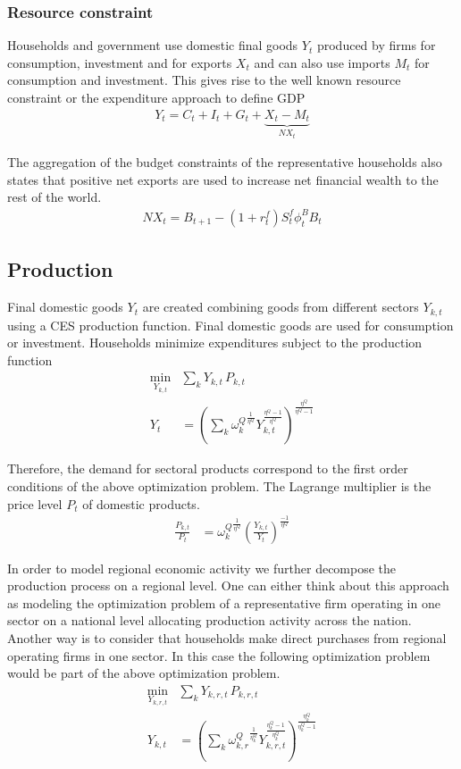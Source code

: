 \documentclass[10pt,a4paper]{article}
\begin{document}
\subsubsection{Resource constraint}

Households and government use domestic final goods $Y_t$ produced by firms for consumption, investment and for exports $X_{t}$ and can also use imports $M_t$ for consumption and investment. This gives rise to the well known resource constraint or the expenditure approach to define GDP 
\begin{align}
Y_{t} = C_{t} + I_{t} + G_{t} + \underbrace{X_{t} - M_{t}}_{NX_{t}}
\end{align}

The aggregation of the budget constraints of the representative households also states that positive net exports are used to increase net financial wealth to the rest of the world.
\begin{align}
NX_t = B_{t+1} - (1 + r^{f}_{t}) S^{f}_{t} \phi^B_{t} B_{t}
\end{align}

\subsection{Production}

Final domestic goods $Y_{t}$ are created combining goods from different sectors $Y_{k,t}$ using a CES production function. Final domestic goods are used for consumption or investment. Households minimize expenditures subject to the production function
\begin{align}
\underset{Y_{k,t}}{\mathrm{min}} & \sum_{k} Y_{k,t} \, P_{k,t} \\ 
Y_{t} &= \left(\sum_{k} {\omega^{Q}_{k}}^{\frac{1}{\eta^Q}} Y_{k,t}^{\frac{\eta^Q-1}{\eta^Q}} \right)^{\frac{\eta^Q}{\eta^Q-1}}
\end{align}

Therefore, the demand for sectoral products correspond to the first order conditions of the above optimization problem. The Lagrange multiplier is the price level $P_{t}$ of domestic products. 
\begin{align}
\frac{P_{k,t}}{P_{t}} &= {\omega^{Q}_{k}}^{\frac{1}{\eta^Q}} \left(\frac{Y_{k,t}}{Y_{t}}\right)^{\frac{-1}{\eta^Q}}
\end{align}

In order to model regional economic activity we further decompose the production process on a regional level. One can either think about this approach as modeling the optimization problem of a representative firm operating in one sector on a national level allocating production activity across the nation. Another way is to consider that households make direct purchases from regional operating firms in one sector. In this case the following optimization problem would be part of the above optimization problem. 
\begin{align}
\underset{Y_{k,r,t}}{\mathrm{min}} & \sum_{k} Y_{k,r,t} \, P_{k,r,t} \\ 
Y_{k,t} &= \left(\sum_{k} {\omega^{Q}_{k,r}}^{\frac{1}{\eta^Q_{k}}} Y_{k,r,t}^{\frac{\eta^Q_{k}-1}{\eta^Q_{k}}} \right)^{\frac{\eta^Q_{k}}{\eta^Q_{k}-1}}
\end{align}
\end{document}
